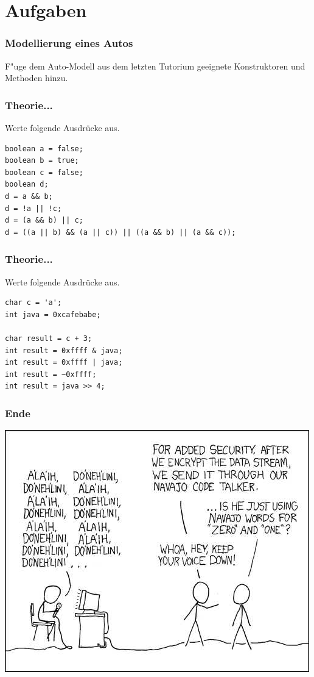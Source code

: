 \documentclass{beamer}
\begin{document}
\section{Aufgaben}
\begin{frame}
\frametitle{Modellierung eines Autos}
F"uge dem Auto-Modell aus dem letzten Tutorium geeignete Konstruktoren und Methoden hinzu.
\end{frame}

\begin{frame}[fragile]
\frametitle{Theorie...}
Werte folgende Ausdr\"{u}cke aus.
\begin{verbatim}
boolean a = false;
boolean b = true;
boolean c = false;
boolean d;
d = a && b;
d = !a || !c;
d = (a && b) || c;
d = ((a || b) && (a || c)) || ((a && b) || (a && c));
\end{verbatim}
\end{frame}

\begin{frame}[fragile]
\frametitle{Theorie...}
Werte folgende Ausdr\"{u}cke aus.
\begin{verbatim}
char c = 'a';
int java = 0xcafebabe;

char result = c + 3;
int result = 0xffff & java;
int result = 0xffff | java;
int result = ~0xffff;
int result = java >> 4;
\end{verbatim}
\end{frame}

\begin{frame}
\frametitle{Ende}
\includegraphics[scale=0.4]{code_talkers.jpg}
\end{frame}
\end{document}
